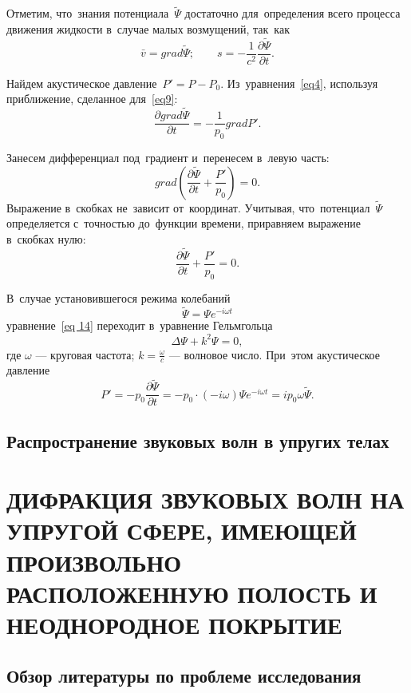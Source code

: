Отметим, что~знания потенциала~$\tilde\Psi$ достаточно для~определения всего процесса движения жидкости в~случае малых возмущений, так~как
$$
\bar{v}= grad\tilde\Psi;\qquad s=-\frac{1}{c^2}\frac{\partial\tilde\Psi}{\partial t}.
$$

Найдем акустическое давление~$P'=P-P_0$. Из~уравнения~\eqref{eq4}, используя приближение, сделанное для~\eqref{eq9}:
$$
\frac{\partial  grad \tilde\Psi}{\partial t} = - \frac{1}{p_0} grad P'.
$$

Занесем дифференциал под~градиент и~перенесем в~левую часть:
$$
 grad \left(\frac{\partial \tilde\Psi}{\partial t} + \frac{P'}{p_0}\right) = 0.
$$
Выражение в~скобках не~зависит от~координат. Учитывая, что~потенциал~$\tilde\Psi$ определяется с~точностью до~функции времени, приравняем выражение в~скобках нулю:
$$
\frac{\partial \tilde\Psi}{\partial t} + \frac{P'}{p_0} = 0.
$$

В~случае установившегося режима колебаний
\begin{equation}\label{eq 15}
\tilde\Psi=\Psi  e^{-i\omega t}
\end{equation}
уравнение~\eqref{eq 14} переходит в~уравнение Гельмгольца
\begin{equation}\label{eq 16}
\Delta{\Psi}+k^2\Psi=0,
\end{equation}
где $\omega$ --- круговая частота; $k=\frac{\omega}{c}$ --- волновое число.
При~этом акустическое давление 
$$
P'=-p_0 \frac{\partial \tilde\Psi}{\partial t}=-p_0 \cdot (-i \omega) \Psi  e^{-i\omega t}=ip_0\omega\tilde{\Psi}.
$$


\newpage
\subsection{Распространение звуковых волн в упругих телах}




\newpage
\section{ДИФРАКЦИЯ ЗВУКОВЫХ ВОЛН НА УПРУГОЙ СФЕРЕ, ИМЕЮЩЕЙ ПРОИЗВОЛЬНО РАСПОЛОЖЕННУЮ ПОЛОСТЬ И НЕОДНОРОДНОЕ ПОКРЫТИЕ}

\newpage
\subsection{Обзор литературы по проблеме исследования}


\newpage
